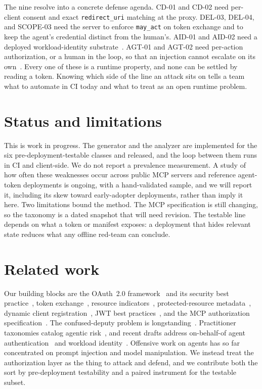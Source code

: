 The nine resolve into a concrete defense agenda. CD-01 and CD-02 need per-client
consent and exact \texttt{redirect\_uri} matching at the proxy. DEL-03, DEL-04, and
SCOPE-03 need the server to enforce \texttt{may\_act} on token exchange and to keep
the agent's credential distinct from the human's. AID-01 and AID-02 need a deployed
workload-identity substrate~\cite{wimse,spiffe}. AGT-01 and AGT-02 need per-action
authorization, or a human in the loop, so that an injection cannot escalate on its
own~\cite{owaspagentic}. Every one of these is a runtime property, and none can be
settled by reading a token. Knowing which side of the line an attack sits on tells a
team what to automate in CI today and what to treat as an open runtime problem.

\section{Status and limitations}\label{sec:status}
This is work in progress. The generator and the analyzer are implemented for the six
pre-deployment-testable classes and released, and the loop between them runs in CI and
client-side. We do not report a prevalence measurement. A study of how often these
weaknesses occur across public MCP servers and reference agent-token deployments is
ongoing, with a hand-validated sample, and we will report it, including its skew
toward early-adopter deployments, rather than imply it here. Two limitations bound the
method. The MCP specification is still changing, so the taxonomy is a dated snapshot
that will need revision. The testable line depends on what a token or manifest
exposes: a deployment that hides relevant state reduces what any offline red-team can
conclude.

\section{Related work}\label{sec:related}
Our building blocks are the OAuth~2.0 framework~\cite{rfc6749} and its security best
practice~\cite{rfc9700}, token exchange~\cite{rfc8693}, resource
indicators~\cite{rfc8707}, protected-resource metadata~\cite{rfc9728}, dynamic client
registration~\cite{rfc7591}, JWT best practices~\cite{rfc8725}, and the MCP
authorization specification~\cite{mcpauth}. The confused-deputy problem is
longstanding~\cite{hardy1988confused,cwe441}. Practitioner taxonomies catalog
agentic risk~\cite{owaspllm,owaspagentic}, and recent drafts address on-behalf-of
agent authentication~\cite{oboagents} and workload identity~\cite{wimse,spiffe}.
Offensive work on agents has so far concentrated on prompt injection and model
manipulation. We instead treat the authorization layer as the thing to attack and
defend, and we contribute both the sort by pre-deployment testability and a paired
instrument for the testable subset.

